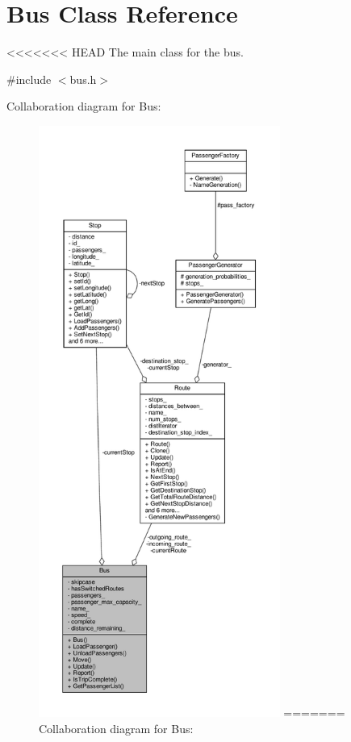 \hypertarget{classBus}{}\section{Bus Class Reference}
\label{classBus}


<<<<<<< HEAD
The main class for the bus.  




{\ttfamily \#include $<$bus.\+h$>$}



Collaboration diagram for Bus\+:\nopagebreak
\begin{figure}[H]
\begin{center}
\leavevmode
\includegraphics[height=550pt]{classBus__coll__graph}
=======
Collaboration diagram for Bus\+:
\nopagebreak
\begin{figure}[H]
\begin{center}

\end{center}
\end{figure}
\end{center}
\end{figure}
